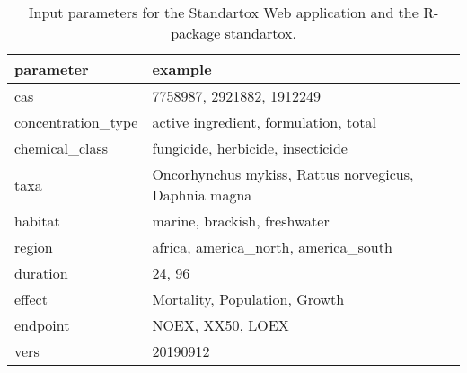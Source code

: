 \begin{table}[ht]
  \caption{Input parameters for the Standartox Web application and the R-package standartox.}
  \label{tab:app-parameters}
  \centering
\begin{tabular}{ll}
  \hline
  parameter & example \\ 
  \hline
  cas & 7758987, 2921882, 1912249 \\
  concentration\_type & active ingredient, formulation, total \\
  chemical\_class & fungicide, herbicide, insecticide \\
  taxa & Oncorhynchus mykiss, Rattus norvegicus, Daphnia magna \\
  habitat & marine, brackish, freshwater \\
  region & africa, america_north, america_south \\
  duration & 24, 96 \\
  effect & Mortality, Population, Growth \\
  endpoint & NOEX, XX50, LOEX \\
  vers & 20190912 \\
  \hline
\end{tabular}
\end{table}

